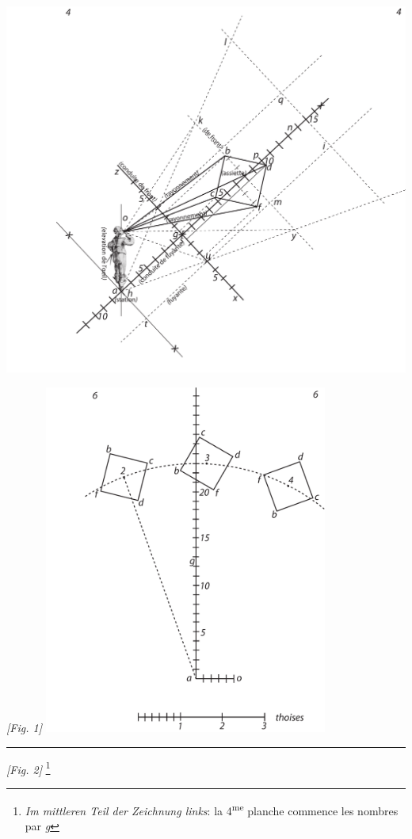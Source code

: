 \protect\clearpage
\begin{center}
\includegraphics[width=1.0\textwidth]{images/T4-Desargues}
\\\rule[-4mm]{0mm}{10mm}\textit{[Fig. 1]}
\protect\clearpage
\includegraphics[width=0.7\textwidth]{images/T6-Desargues}\end{center}
\protect\rule[0mm]{60mm}{0mm}\textit{[Fig. 2]}
\footnote{\textit{Im mittleren Teil der Zeichnung links}: la 4\textsuperscript{me} planche commence les nombres par \textit{g}}
